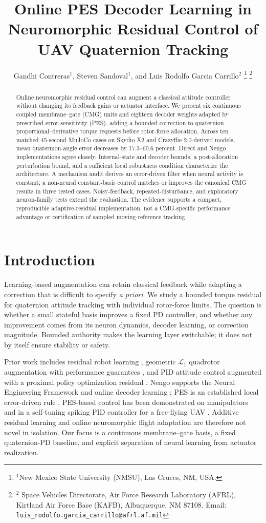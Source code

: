 \documentclass[letterpaper, 10 pt, conference]{ieeeconf}
\title{\LARGE \bf Online PES Decoder Learning in Neuromorphic Residual Control of UAV Quaternion Tracking}
\author{Gandhi Contreras$^{1}$, Steven Sandoval$^{1}$, and Luis Rodolfo Garcia Carrillo$^{2}$%
\thanks{$^{1}$New Mexico State University (NMSU), Las Cruces, NM, USA.}%
\thanks{$^{2}$ Space Vehicles Directorate, Air Force Research Laboratory (AFRL), Kirtland Air Force Base (KAFB), Albuquerque, NM 87108.
    Email: {\tt\small luis\_rodolfo.garcia\_carrillo@afrl.af.mil}}%
}
\begin{document}
\maketitle

\pagestyle{plain}
\thispagestyle{plain}

\begin{abstract}
Online neuromorphic residual control can augment a classical attitude controller without changing its feedback gains or actuator interface. We present six continuous coupled membrane--gate (CMG) units and eighteen decoder weights adapted by prescribed error sensitivity (PES), adding a bounded correction to quaternion proportional--derivative torque requests before rotor-force allocation. Across ten matched 45-second MuJoCo cases on Skydio X2 and Crazyflie 2.0-derived models, mean quaternion-angle error decreases by 17.3--60.6 percent. Direct and Nengo implementations agree closely. Internal-state and decoder bounds, a post-allocation perturbation bound, and a sufficient local robustness condition characterize the architecture. A mechanism audit derives an error-driven filter when neural activity is constant; a non-neural constant-basis control matches or improves the canonical CMG results in three tested cases. Noisy-feedback, repeated-disturbance, and exploratory neuron-family tests extend the evaluation. The evidence supports a compact, reproducible adaptive-residual implementation, not a CMG-specific performance advantage or certification of sampled moving-reference tracking.
\end{abstract}

\section{Introduction}

Learning-based augmentation can retain classical feedback while adapting a correction that is difficult to specify \emph{a priori}. We study a bounded torque residual for quaternion attitude tracking with individual rotor-force limits. The question is whether a small stateful basis improves a fixed PD controller, and whether any improvement comes from its neuron dynamics, decoder learning, or correction magnitude. Bounded authority makes the learning layer switchable; it does not by itself ensure stability or safety.

Prior work includes residual robot learning \cite{johannink2019}, geometric $\mathcal L_1$ quadrotor augmentation with performance guarantees \cite{wu2025l1quad}, and PID attitude control augmented with a proximal policy optimization residual \cite{li2027hpappo}. Nengo supports the Neural Engineering Framework and online decoder learning \cite{bekolay2014nengo}; PES is an established local error-driven rule \cite{voelker2015pes}. PES-based control has been demonstrated on manipulators \cite{dewolf2016arm,dewolf2020nengo} and in a self-tuning spiking PID controller for a free-flying UAV \cite{olivares2026selftuning}. Additive residual learning and online neuromorphic flight adaptation are therefore not novel in isolation. Our focus is a continuous membrane--gate basis, a fixed quaternion-PD baseline, and explicit separation of neural learning from actuator realization.
\end{document}
